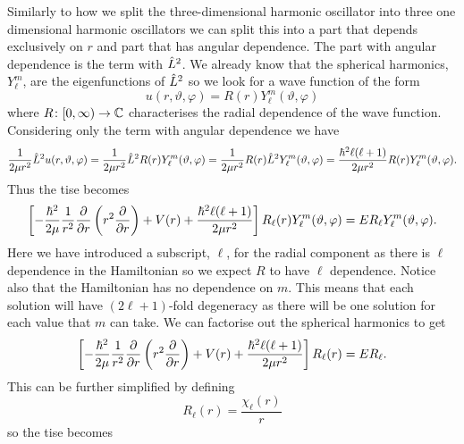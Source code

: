 \documentclass[a4paper]{article}
\theoremstyle{definition}
\begin{document}
    Similarly to how we split the three-dimensional harmonic oscillator into three one dimensional harmonic oscillators we can split this into a part that depends exclusively on \(r\) and part that has angular dependence.
    The part with angular dependence is the term with \(\hat{L}^2\).
    We already know that the spherical harmonics, \(Y_\ell^m\), are the eigenfunctions of \(\hat{L}^2\) so we look for a wave function of the form
    \[u(r, \vartheta, \varphi) = R(r)Y_\ell^m(\vartheta, \varphi)\]
    where \(R\colon[0, \infty)\to\mathbb{C}\) characterises the radial dependence of the wave function.
    Considering only the term with angular dependence we have
    \[\frac{1}{2\mu r^2}\hat{L}^2u(r, \vartheta, \varphi) = \frac{1}{2\mu r^2}\hat{L}^2R(r)Y_\ell^m(\vartheta, \varphi) = \frac{1}{2\mu r^2}R(r)\hat{L}^2Y_\ell^m(\vartheta, \varphi) = \frac{\hbar^2 \ell(\ell + 1)}{2\mu r^2}R(r)Y_\ell^m(\vartheta, \varphi).\]
    Thus the \gls{tise} becomes
    \[\left[-\frac{\hbar^2}{2\mu}\frac{1}{r^2}\pdv{r} \left(r^2\pdv{r}\right) + V(r) + \frac{\hbar^2\ell(\ell + 1)}{2\mu r^2}\right]R_\ell(r)Y_\ell^m(\vartheta, \varphi) = ER_{\ell}Y_\ell^m(\vartheta, \varphi).\]
    Here we have introduced a subscript, \(\ell\), for the radial component as there is \(\ell\) dependence in the Hamiltonian so we expect \(R\) to have \(\ell\) dependence.
    Notice also that the Hamiltonian has no dependence on \(m\).
    This means that each solution will have \((2\ell + 1)\)-fold degeneracy as there will be one solution for each value that \(m\) can take.
    We can factorise out the spherical harmonics to get
    \[\left[-\frac{\hbar^2}{2\mu}\frac{1}{r^2}\pdv{r} \left(r^2\pdv{r}\right) + V(r) + \frac{\hbar^2\ell(\ell + 1)}{2\mu r^2}\right]R_\ell(r) = ER_{\ell}.\]
    This can be further simplified by defining
    \[R_\ell(r) = \frac{\chi_\ell(r)}{r}\]
    so the \gls{tise} becomes
\end{document}
